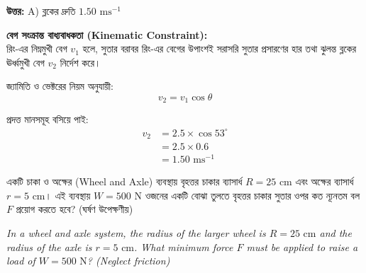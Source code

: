 \documentclass[12pt, a4paper]{article}
\begin{document}
\vspace{0.5em}
\begin{tcolorbox}[answerbox]
    \textbf{\color{success} উত্তর:} A) ব্লকের দ্রুতি $1.50\text{ ms}^{-1}$
\end{tcolorbox}
\vspace{1em}

\begin{tcolorbox}[solutionbox={সমাধান (Solution)}]
    \noindent
    \textbf{বেগ সংক্রান্ত বাধ্যবাধকতা (Kinematic Constraint):} \\
    রিং-এর নিম্নমুখী বেগ $v_1$ হলে, সুতার বরাবর রিং-এর বেগের উপাংশই সরাসরি সুতার প্রসারণের হার তথা ঝুলন্ত ব্লকের ঊর্ধ্বমুখী বেগ $v_2$ নির্দেশ করে।
    
    জ্যামিতি ও ভেক্টরের নিয়ম অনুযায়ী:
    \[ v_2 = v_1 \cos\theta \]
    
    প্রদত্ত মানসমূহ বসিয়ে পাই:
    \begin{align*}
        v_2 &= 2.5 \times \cos 53^\circ \\
            &= 2.5 \times 0.6 \\
            &= \mathbf{1.50}\text{ ms}^{-1}
    \end{align*}
\end{tcolorbox}
\begin{tcolorbox}[questionbox={প্রশ্ন (Question) 11}]
    \noindent
    একটি চাকা ও অক্ষের (Wheel and Axle) ব্যবস্থায় বৃহত্তর চাকার ব্যাসার্ধ $R = 25\text{ cm}$ এবং অক্ষের ব্যাসার্ধ $r = 5\text{ cm}$। এই ব্যবস্থায় $W = 500\text{ N}$ ওজনের একটি বোঝা তুলতে বৃহত্তর চাকার সুতার ওপর কত ন্যূনতম বল $F$ প্রয়োগ করতে হবে? (ঘর্ষণ উপেক্ষণীয়)
    
    \vspace{0.8em}
    \begin{english}
    \noindent\textit{\color{darkgray}
    In a wheel and axle system, the radius of the larger wheel is $R = 25\text{ cm}$ and the radius of the axle is $r = 5\text{ cm}$. What minimum force $F$ must be applied to raise a load of $W = 500\text{ N}$? (Neglect friction)
    }
    \end{english}
\end{tcolorbox}
\end{document}
